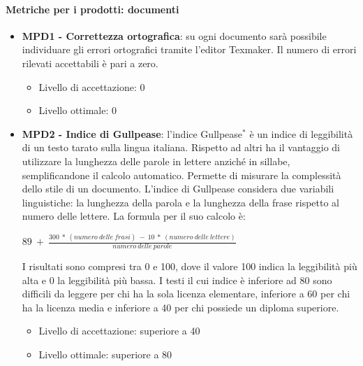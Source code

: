 \documentclass[11pt,a4paper]{article}
\begin{document}
{	
	\paragraph{Metriche per i prodotti: documenti} 
	\begin{itemize}
		\item \textbf{MPD1 - Correttezza ortografica}: su ogni documento sarà possibile individuare gli errori ortografici tramite l'editor Texmaker. Il numero di errori rilevati accettabili è pari a zero.
		\begin{itemize}
	 \item Livello di accettazione: 0
	 \item Livello ottimale: 0
	 \end{itemize}
	 
		\item \textbf{MPD2 - Indice di Gullpease}: l'indice Gullpease$^*$ è un indice di leggibilità di un testo tarato sulla lingua italiana. Rispetto ad altri ha il vantaggio di utilizzare la lunghezza delle parole in lettere anziché in sillabe, semplificandone il calcolo automatico. Permette di misurare la complessità dello stile di un documento. L'indice di Gullpease considera due variabili linguistiche: la lunghezza della parola e la lunghezza della frase rispetto al numero delle lettere. La formula per il suo calcolo è:
	\begin{center}
		$89\ +\ \frac{300\ *\ (numero\ delle\ frasi)\ -\ 10\ *\ (numero\ delle\ lettere)}{numero\ delle\ parole}$
	\end{center}
	I risultati sono compresi tra 0 e 100, dove il valore 100 indica la leggibilità più alta e 0 la leggibilità più bassa. I testi il cui indice è inferiore ad 80 sono difficili da leggere per chi ha la sola licenza elementare, inferiore a 60 per chi ha la licenza media e inferiore a 40 per chi possiede un diploma superiore.
	\begin{itemize}
	 \item Livello di accettazione: superiore a 40
	 \item Livello ottimale: superiore a 80
	 \end{itemize}	
	\end{itemize}
	
}
\end{document}
